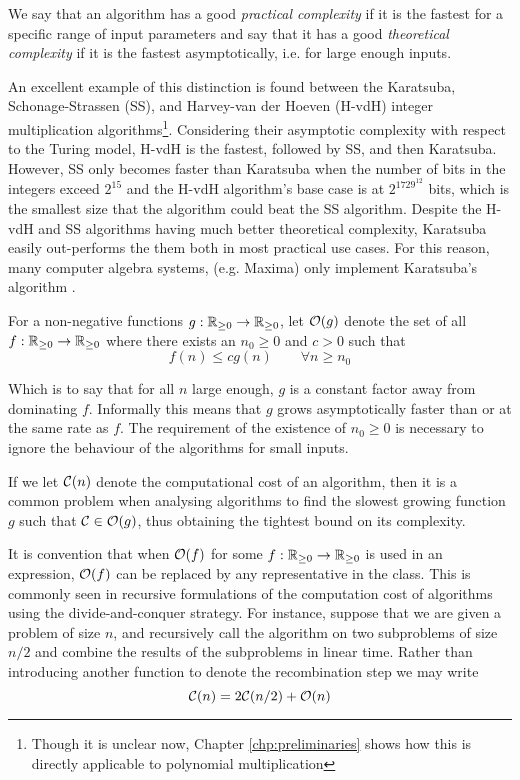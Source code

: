 We say that an algorithm has a good \textit{practical complexity} if it is the fastest for a specific range of input parameters and say that it has a good \textit{theoretical complexity} if it is the fastest asymptotically, i.e. for large enough inputs.

An excellent example of this distinction is found between the Karatsuba, Schonage-Strassen (SS), and Harvey-van der Hoeven (H-vdH) integer multiplication algorithms\footnote{Though it is unclear now, Chapter \ref{chp:preliminaries} shows how this is directly applicable to polynomial multiplication}. Considering their asymptotic complexity with respect to the Turing model, H-vdH is the fastest, followed by SS, and then Karatsuba. However, SS only becomes faster than Karatsuba when the number of bits in the integers exceed $2^{15}$ \cite{magma-archive} and the H-vdH algorithm's base case is at $2^{1729^{12}}$ bits, which is the smallest size that the algorithm could beat the SS algorithm. Despite the H-vdH and SS algorithms having much better theoretical complexity, Karatsuba easily out-performs the them both in most practical use cases. For this reason, many computer algebra systems, (e.g. Maxima) only implement Karatsuba's algorithm \cite{maxima}.

\begin{definition}
    For a non-negative functions $g: {\mathbb R}_{\ge 0} \to {\mathbb R}_{\ge 0}$, let $\mathcal O(g)$ denote the set of all $f: {\mathbb R}_{\ge 0} \to {\mathbb R}_{\ge 0}$ where there exists an $n_0 \ge 0$ and $c > 0$ such that
    \begin{equation}\label{eq:big-o}
        f(n) \le cg(n) \qquad \forall n \ge n_0
    \end{equation}
\end{definition}
Which is to say that for all $n$ large enough, $g$ is a constant factor away from dominating $f$. Informally this means that $g$ grows asymptotically faster than or at the same rate as $f$. The requirement of the existence of $n_0 \ge 0$ is necessary to ignore the behaviour of the algorithms for small inputs.

If we let $\mathcal C(n)$ denote the computational cost of an algorithm, then it is a common problem when analysing algorithms to find the slowest growing function $g$ such that $\mathcal C \in \mathcal O(g)$, thus obtaining the tightest bound on its complexity.

It is convention that when $\mathcal O(f)$ for some $f: {\mathbb R}_{\ge 0} \to {\mathbb R}_{\ge 0}$ is used in an expression, $\mathcal O(f)$ can be replaced by any representative in the class. This is commonly seen in recursive formulations of the computation cost of algorithms using the divide-and-conquer strategy. For instance, suppose that we are given a problem of size $n$, and recursively call the algorithm on two subproblems of size $n/2$ and combine the results of the subproblems in linear time. Rather than introducing another function to denote the recombination step we may write
\[
    \mathcal C(n) = 2\mathcal C(n/2) + \mathcal O(n)
\]

